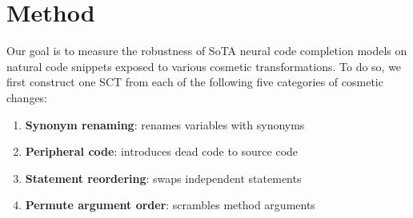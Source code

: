 \documentclass[usenames,dvipsnames]{article} %
\begin{document}



  \section{Method}

  Our goal is to measure the robustness of SoTA neural code completion models on natural code snippets exposed to various cosmetic transformations. To do so, we first construct one SCT from each of the following five categories of cosmetic changes:

  \begin{enumerate}[itemsep=1ex]
    \item \textbf{Synonym renaming}: renames variables with synonyms
    \item \textbf{Peripheral code}: introduces dead code to source code
    \item \textbf{Statement reordering}: swaps independent statements
    \item \textbf{Permute argument order}: scrambles method arguments
  \end{enumerate}
\end{document}
